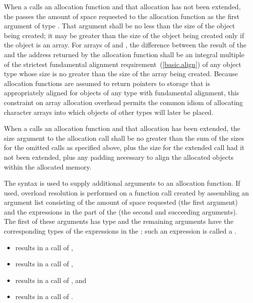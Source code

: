\pnum
When a  calls an allocation function and that
allocation has not been extended, the
 passes the amount of space requested to the
allocation function as the first argument of type
. That argument shall be no less than the size
of the object being created; it may be greater than the size of the
object being created only if the object is an array. For arrays of
 and , the difference between the
result of the  and the address returned by the
allocation function shall be an integral multiple of the
strictest fundamental
alignment requirement~(\ref{basic.align}) of any object type whose size
is no greater than the size of the array being created.
\enternote 
{}%
Because allocation functions are assumed to return pointers to storage
that is appropriately aligned for objects of any type
with fundamental alignment, this constraint
on array allocation overhead permits the common idiom of allocating
character arrays into which objects of other types will later be placed.
\exitnote 

\pnum
When a  calls an allocation function and that
allocation has been extended, the size argument to the allocation call shall
be no greater than the sum of the sizes for the omitted calls as specified
above, plus the size for the extended call had it not been extended, plus any
padding necessary to align the allocated objects within the allocated memory.



\pnum
{}%
The  syntax is used to supply additional
arguments to an allocation function. If used, overload resolution is
performed on a function call created by assembling an argument list
consisting of the amount of space requested (the first argument) and the
expressions in the  part of the
 (the second and succeeding arguments). The
first of these arguments has type  and the remaining
arguments have the corresponding types of the expressions in the
; such an expression is called a
.

\pnum
\enterexample 

\begin{itemize}
\item {} results in a call of ,

\item {} results in a call of ,

\item {} results in a call of , and

\item {} results in a call of .
\end{itemize}

